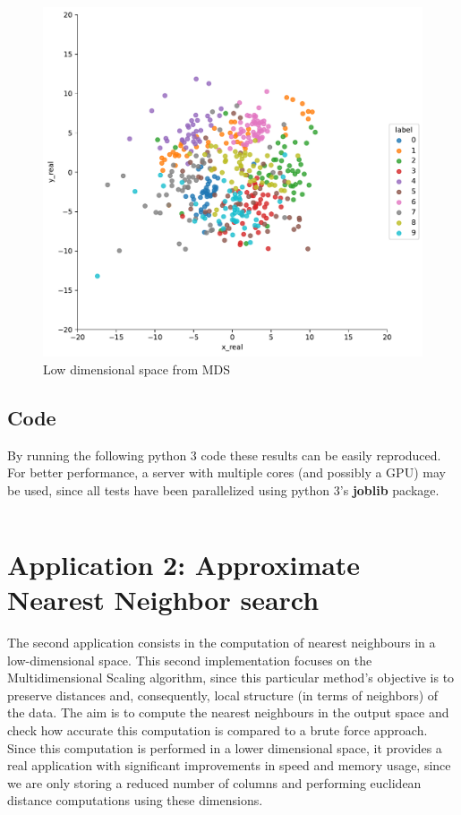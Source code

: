 \documentclass[a4paper,11pt,spanish]{report}
\begin{document}
\begin{figure}[p]
\centering
\includegraphics[width=12cm]{figures/app1plotrealmds.pdf}
\caption{\label{figureTSNE}Low dimensional space from MDS}
\end{figure}

\newpage

\subsection{Code}
\label{ssec:code1}

By running the following python 3 code these results can be easily reproduced. For better performance, a server with multiple cores (and possibly a GPU) may be used, since all tests have been parallelized using python 3's \textbf{joblib} package.

\vspace{10px}

\inputminted[baselinestretch=1, fontsize=\scriptsize, breaklines]{python}{application1.py}

\section{Application 2: Approximate Nearest Neighbor search}
\label{sec:app2}

The second application consists in the computation of nearest neighbours in a low-dimensional space. This second implementation focuses on the Multidimensional Scaling algorithm, since this particular method's objective is to preserve distances and, consequently, local structure (in terms of neighbors) of the data. The aim is to compute the nearest neighbours in the output space and check how accurate this computation is compared to a brute force approach. Since this computation is performed in a lower dimensional space, it provides a real application with significant improvements in speed and memory usage, since we are only storing a reduced number of columns and performing euclidean distance computations using these dimensions.
\end{document}
